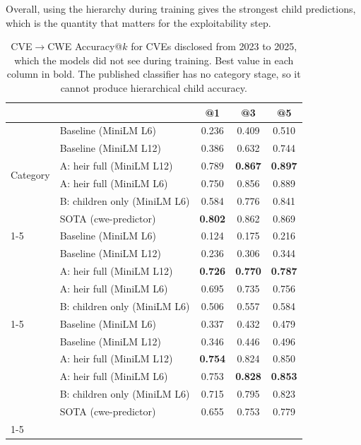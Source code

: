 \documentclass[conference,compsoc]{IEEEtran}
\begin{document}
Overall, using the hierarchy during training gives the strongest child predictions, which is the quantity that matters for the exploitability step.

\begin{table}[H]
\centering

\caption{CVE$\rightarrow$CWE Accuracy@$k$ for CVEs disclosed from 2023 to 2025, which the models did not see during training. Best value in each column in bold. The published classifier has no category stage, so it cannot produce hierarchical child accuracy.}
\label{tab:accuracy}
\begin{tabular}{llccc}
\toprule
 &  & @1 & @3 & @5 \\
\midrule
\multirow[c]{6}{*}{Category} & Baseline (MiniLM L6) & 0.236 & 0.409 & 0.510 \\
 & Baseline (MiniLM L12) & 0.386 & 0.632 & 0.744 \\
 & A: heir full (MiniLM L12) & 0.789 & \textbf{0.867} & \textbf{0.897} \\
 & A: heir full (MiniLM L6) & 0.750 & 0.856 & 0.889 \\
 & B: children only (MiniLM L6) & 0.584 & 0.776 & 0.841 \\
 & SOTA (cwe-predictor) & \textbf{0.802} & 0.862 & 0.869 \\
\cline{1-5}
\multirow[c]{5}{*}{Child (hier.)} & Baseline (MiniLM L6) & 0.124 & 0.175 & 0.216 \\
 & Baseline (MiniLM L12) & 0.236 & 0.306 & 0.344 \\
 & A: heir full (MiniLM L12) & \textbf{0.726} & \textbf{0.770} & \textbf{0.787} \\
 & A: heir full (MiniLM L6) & 0.695 & 0.735 & 0.756 \\
 & B: children only (MiniLM L6) & 0.506 & 0.557 & 0.584 \\
\cline{1-5}
\multirow[c]{6}{*}{Child (flat)} & Baseline (MiniLM L6) & 0.337 & 0.432 & 0.479 \\
 & Baseline (MiniLM L12) & 0.346 & 0.446 & 0.496 \\
 & A: heir full (MiniLM L12) & \textbf{0.754} & 0.824 & 0.850 \\
 & A: heir full (MiniLM L6) & 0.753 & \textbf{0.828} & \textbf{0.853} \\
 & B: children only (MiniLM L6) & 0.715 & 0.795 & 0.823 \\
 & SOTA (cwe-predictor) & 0.655 & 0.753 & 0.779 \\
\cline{1-5}
\bottomrule
\end{tabular}
\end{table}
\end{document}
